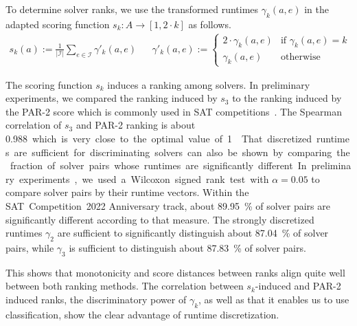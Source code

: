 \documentclass[runningheads]{llncs}
\begin{document}
To determine solver ranks, we use the transformed runtimes $\gamma_k(a, e)$ in the adapted scoring function $s_k : A \rightarrow [1, 2 \cdot k]$ as follows.
\begin{align}
  s_k(a) := \frac{1}{|\mathcal{I}|} \sum_{e \in \mathcal{I}} \gamma'_k(a, e)
  &&
  \gamma'_k(a, e) := \begin{cases}
  	2 \cdot \gamma_k(a, e) 	& \text{if } \gamma_k(a, e) = k\\
	\gamma_k(a, e)	& \text{otherwise}
  \end{cases}
  \label{eq:rankingeq}
\end{align}

The scoring function $s_k$ induces a ranking among solvers. 
In preliminary experiments, we compared the ranking induced by $s_3$ to the ranking induced by the PAR-2 score which is commonly used in SAT competitions~\cite{FroleyksHIJS21}. 
The Spearman correlation of $s_3$ and PAR-2 ranking is about \SI{0.988} which is very close to the optimal value of 1~\cite{de2016comparing}.

That discretized runtimes are sufficient for discriminating solvers can also be shown by comparing the fraction of solver pairs whose runtimes are significantly different. 
In preliminary experiments, we used a Wilcoxon signed rank test with $\alpha = 0.05$ to compare solver pairs by their runtime vectors.
Within the SAT~Competition~2022 Anniversary track, about \SI{89.95}{\%} of solver pairs are significantly different according to that measure.
The strongly discretized runtimes $\gamma_2$ are sufficient to significantly distinguish about \SI{87.04}{\%} of solver pairs, while $\gamma_3$ is sufficient to distinguish about \SI{87.83}{\%} of solver pairs.


This shows that monotonicity and score distances between ranks align quite well between both ranking methods.
The correlation between $s_k$-induced and PAR-2 induced ranks, the discriminatory power of $\gamma_k$, as well as that it enables us to use classification, show the clear advantage of runtime discretization.
\end{document}
